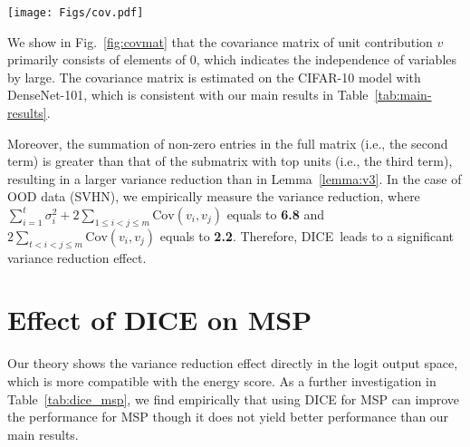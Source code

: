 \documentclass[runningheads]{llncs}
\newcommand{\methodAbbr}{DICE~}
\begin{document}
\begin{figure*}[ht]
	\begin{center}
		\texttt{[image: Figs/cov.pdf]}
	\end{center}
	\caption{Covariance matrix of unit contribution estimated on the OOD dataset SVHN. Model is trained on ID dataset CIFAR-10. The unit indices are sorted from low to high, based on the expectation value of ID's unit contribution (airplane class, same as in Figure~\ref{fig:whytopk}). The matrix primarily consists of elements with 0 value. }
	\label{fig:covmat}
\end{figure*}



We show in Fig.~\ref{fig:covmat} that the covariance matrix of unit contribution $v$ primarily consists of elements of 0, which indicates the independence of variables by large. The covariance matrix is estimated on the CIFAR-10 model with DenseNet-101, which is consistent with our main results in Table~\ref{tab:main-results}. 

Moreover, the summation of non-zero entries in the full matrix (i.e., the second term) is greater than that of the submatrix with top units (i.e., the third term), resulting in a larger variance reduction than in Lemma~\ref{lemma:v3}. In the case of OOD data (SVHN), we empirically measure the  variance reduction, where
$\sum_{i=1}^{t} \sigma_i^2  + 2 \sum_{1\le i < j \le m} \mathrm{Cov}(v_i, v_j)$ equals to \textbf{6.8} and $2\sum_{t< i <j \le m} \mathrm{Cov}(v_i, v_j)$ equals to \textbf{2.2}. Therefore, \methodAbbr leads to a significant variance reduction effect. 

\section{Effect of DICE on MSP}
\label{sec:dice_msp}
Our theory shows the variance reduction effect directly in the logit output space, which is more compatible with the energy score. As a further investigation in Table~\ref{tab:dice_msp}, we find empirically that using DICE for MSP can improve the performance for MSP though it does not yield better performance than our main results. 

\begin{table*}[ht]
\caption[]{\small Effect of applying \methodAbbr with MSP on DenseNet101 pretrained on CIFAR-10. The number is reported in FPR95. }
\centering
{}
\label{tab:dice_msp}
\end{table*}
\end{document}

